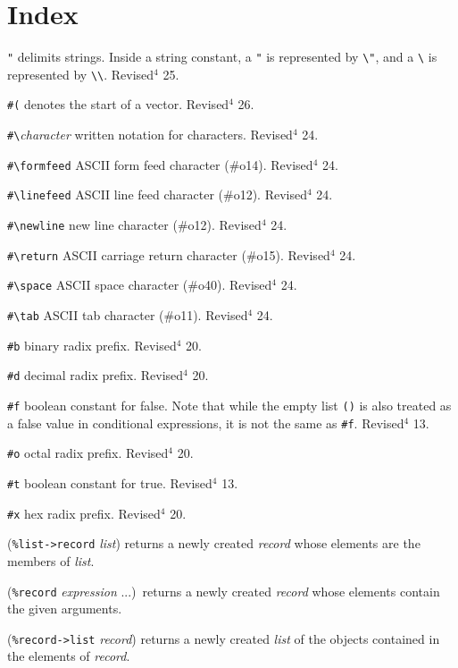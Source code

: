 \documentclass[10pt,twocolumn]{article}
\begin{document}
\section*{Index}

\texttt{"} delimits strings.  Inside a string constant, a \texttt{"} is represented
by \texttt{\textbackslash"}, and a \texttt{\textbackslash} is represented by \texttt{\textbackslash\textbackslash}.  Revised$^4$ 25.

\texttt{\#(} denotes the start of a vector.  Revised$^4$ 26.

\texttt{\#\textbackslash}\emph{character} written notation for characters.  Revised$^4$ 24.

\texttt{\#\textbackslash{}formfeed} ASCII form feed character (\#o14).  Revised$^4$ 24.

\texttt{\#\textbackslash{}linefeed} ASCII line feed character (\#o12).  Revised$^4$ 24.

\texttt{\#\textbackslash{}newline} new line character (\#o12).  Revised$^4$ 24.

\texttt{\#\textbackslash{}return} ASCII carriage return character (\#o15).  Revised$^4$ 24.

\texttt{\#\textbackslash{}space} ASCII space character (\#o40).  Revised$^4$ 24.

\texttt{\#\textbackslash{}tab} ASCII tab character (\#o11).  Revised$^4$ 24.

\texttt{\#b} binary radix  prefix.  Revised$^4$ 20.

\texttt{\#d} decimal radix prefix.  Revised$^4$ 20.

\texttt{\#f} boolean constant for false.  Note that while the empty list
\texttt{()} is also treated as a false value in conditional expressions,
it is not the same as \texttt{\#f}.  Revised$^4$ 13.

\texttt{\#o} octal radix prefix.  Revised$^4$ 20.

\texttt{\#t} boolean constant for true.  Revised$^4$ 13.

\texttt{\#x} hex radix prefix.  Revised$^4$ 20.

(\texttt{\%list->record} \emph{list}) returns a newly created \emph{record} whose
elements are the members of \emph{list}.

(\texttt{\%record} \emph{expression} ...)\ returns a newly created
\emph{record} whose elements contain the given arguments.

(\texttt{\%record->list} \emph{record}) returns a newly created
\emph{list} of the objects contained in the elements of
\emph{record}.
\end{document}
